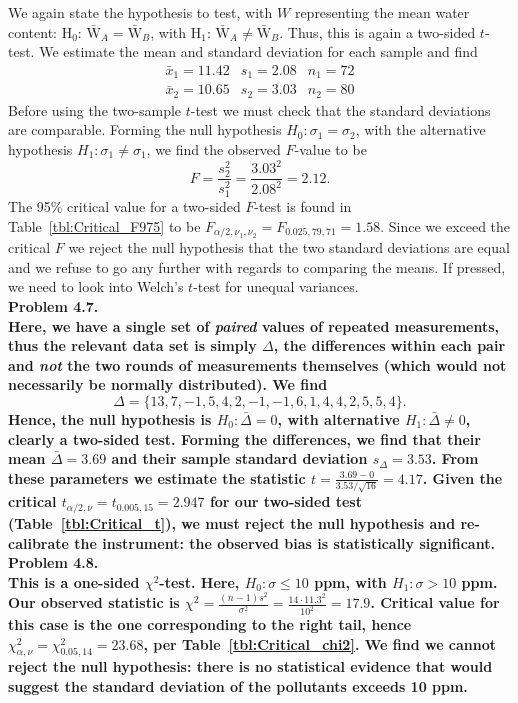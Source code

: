 We again state the hypothesis to test, with $W$ representing the mean water content: H$_0$: $\bar{\mbox{W}}_A = \bar{\mbox{W}}_B$,
with H$_1$: $\bar{\mbox{W}}_A \neq \bar{\mbox{W}}_B$.  Thus, this is again a two-sided $t$-test.  We estimate the mean and
standard deviation for each sample and find
\[ \begin{array}{cccc}
\bar{x}_1 = 11.42 & s_1 = 2.08 & n_1 = 72 \\
\bar{x}_2 = 10.65 & s_2 = 3.03 & n_2 = 80
\end{array}
\]
Before using the two-sample $t$-test we must check that the standard deviations are
comparable.  Forming the null hypothesis $H_0: \sigma_1 = \sigma_2$, with the alternative
hypothesis $H_1: \sigma_1 \neq \sigma_1$, we find the observed $F$-value to be
\[ F = \frac{s_2^2}{s_1^2} = \frac{3.03^2}{2.08^2} = 2.12. \]
The 95\% critical value for a two-sided $F$-test is found in Table~\ref{tbl:Critical_F975} to be
$F_{\alpha/2,\nu_1,\nu_2} = F_{0.025,79,71} = 1.58$.
Since we exceed the critical $F$ we reject the null hypothesis that the two standard
deviations are equal and we refuse to go any further with regards to comparing the means.
If pressed, we need to look into Welch's $t$-test for unequal variances.
\\


\noindent
\bf{Problem 4.7.} \\
Here, we have a single set of \emph{paired} values of repeated measurements, thus
the relevant data set is simply $\Delta$, the differences within each pair and \emph{not} the two rounds
of measurements themselves (which would not necessarily be normally distributed).
We find
\[
\Delta = \{13, 7, -1, 5, 4, 2, -1, -1, 6, 1, 4, 4, 2, 5, 5, 4\}.
\]
Hence, the null hypothesis is $H_0: \bar{\Delta} = 0$, with alternative $H_1: \bar{\Delta} \neq 0$, clearly
a two-sided test.  Forming the differences, we find that their mean $\bar{\Delta} = 3.69$ and their sample
standard deviation $s_{\Delta} = 3.53$.  From these parameters we estimate the statistic
$t = \frac{3.69 - 0}{3.53/\sqrt{16}} = 4.17$.  Given the critical $t_{\alpha/2,\nu} = t_{0.005,15} = 2.947$
for our two-sided test (Table~\ref{tbl:Critical_t}), we must reject the null hypothesis and re-calibrate the
instrument: the observed bias is statistically significant.
\\

\noindent
\bf{Problem 4.8.} \\

This is a one-sided $\chi^2$-test.  Here, $H_0: \sigma \leq 10$ ppm, with $H_1: \sigma > 10$ ppm.
Our observed statistic is $\chi^2 = \frac{(n - 1)s^2}{\sigma^2} = \frac{14\cdot11.3^2}{10^2} = 17.9$.
Critical value for this case is the one corresponding to the right tail, hence $\chi^2_{\alpha,\nu} = \chi^2_{0.05,14} = 23.68$,
per Table~\ref{tbl:Critical_chi2}.
We find we cannot reject the null hypothesis: there is no statistical evidence that would suggest the
standard deviation of the pollutants exceeds 10 ppm.
\\

